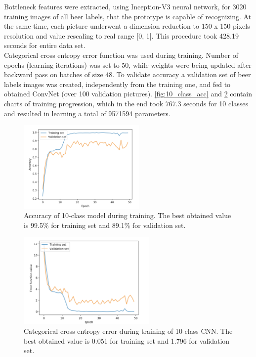 \documentclass[11pt]{article}
\begin{document}
Bottleneck features were extracted, using Inception-V3 neural network, for 3020 training images of all beer labels, that the prototype is capable of recognizing. At the same time, each picture underwent a dimension reduction to 150 x 150 pixels resolution and value rescaling to real range [0, 1]. This procedure took 428.19 seconds for entire data set.\\

Categorical cross entropy error function was used during training. Number of epochs (learning iterations) was set to 50, while weights were being updated after backward pass on batches of size 48. To validate accuracy a validation set of beer labels images was created, independently from the training one, and fed to obtained ConvNet (over 100 validation pictures). \autoref{fig:10_class_acc} and \ref{fig:10_class_err} contain charts of training progression, which in the end took 767.3 seconds for 10 classes and resulted in learning a total of 9571594 parameters.

\begin{figure}[h]
\includegraphics[width=0.55\textwidth]{10_class_acc}
\centering
\caption{Accuracy of 10-class model during training. The best obtained value is 99.5\% for training set and 89.1\% for validation set.}
\label{fig:10_class_acc}
\end{figure}

\begin{figure}[h]
\includegraphics[width=0.6\textwidth]{10_class_err}
\centering
\caption{Categorical cross entropy error during training of 10-class CNN. The best obtained value is 0.051 for training set and 1.796 for validation set.}
\label{fig:10_class_err}
\end{figure}
\end{document}
